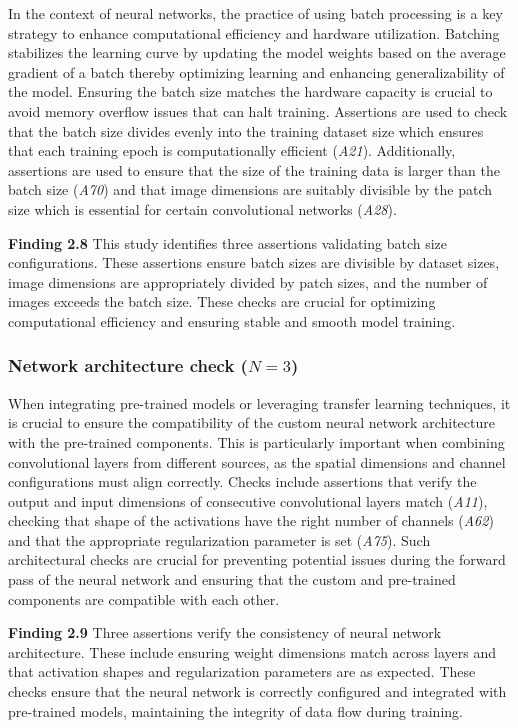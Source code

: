 \documentclass[smallextended]{svjour3}       %
\newcommand{\highlight}[1]{\begin{framed}%
  \noindent#1
\end{framed}}
\begin{document}
In the context of neural networks, the practice of using batch processing is a key strategy to enhance computational efficiency and hardware utilization. Batching stabilizes the learning curve by updating the model weights based on the average gradient of a batch thereby optimizing learning and enhancing generalizability of the model. Ensuring the batch size matches the hardware capacity is crucial to avoid memory overflow issues that can halt training. Assertions are used to check that the batch size divides evenly into the training dataset size which ensures that each training epoch is computationally efficient (\emph{A21}). Additionally, assertions are used to ensure that the size of the training data is larger than the batch size (\emph{A70}) and that image dimensions are suitably divisible by the patch size which is essential for certain convolutional networks (\emph{A28}).

\highlight{\textbf{Finding 2.8} This study identifies three assertions validating batch size configurations. These assertions ensure batch sizes are divisible by dataset sizes, image dimensions are appropriately divided by patch sizes, and the number of images exceeds the batch size. These checks are crucial for optimizing computational efficiency and ensuring stable and smooth model training.}

\subsubsection{Network architecture check ($N = 3$)}

When integrating pre-trained models or leveraging transfer learning techniques, it is crucial to ensure the compatibility of the custom neural network architecture with the pre-trained components. This is particularly important when combining convolutional layers from different sources, as the spatial dimensions and channel configurations must align correctly. Checks include assertions that verify the output and input dimensions of consecutive convolutional layers match (\emph{A11}), checking that shape of the activations have the right number of channels (\emph{A62}) and that the appropriate regularization parameter is set (\emph{A75}). Such architectural checks are crucial for preventing potential issues during the forward pass of the neural network and ensuring that the custom and pre-trained components are compatible with each other.

\highlight{\textbf{Finding 2.9} Three assertions verify the consistency of neural network architecture. These include ensuring weight dimensions match across layers and that activation shapes and regularization parameters are as expected. These checks ensure that the neural network is correctly configured and integrated with pre-trained models, maintaining the integrity of data flow during training.}
\end{document}
